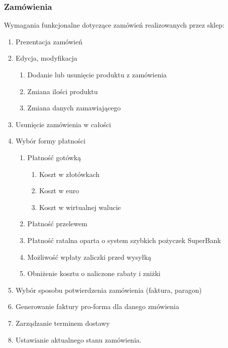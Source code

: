 \subsubsection{Zamówienia}

Wymagania funkcjonalne dotyczące zamówień realizowanych przez sklep:


\begin{enumerate}
  \item Prezentacja zamówień
  \item Edycja, modyfikacja
  \begin{enumerate}
    \item Dodanie lub usunięcie produktu z zamówienia
    \item Zmiana ilości produktu
    \item Zmiana danych zamawiającego
  \end{enumerate}
  \item Usunięcie zamówienia w całości
  \item Wybór formy płatności
  \begin{enumerate}
    \item Płatność gotówką
    \begin{enumerate}
      \item Koszt w złotówkach
      \item Koszt w euro
      \item Koszt w wirtualnej walucie
    \end{enumerate}
    \item Płatność przelewem
    \item Płatność ratalna oparta o system szybkich pożyczek SuperBank
    \item Możliwość wpłaty zaliczki przed wysyłką
    \item Obniżenie kosztu o naliczone rabaty i zniżki
  \end{enumerate}
  \item Wybór sposobu potwierdzenia zamówienia (faktura, paragon)
  \item Generowanie faktury pro-forma dla danego zmówienia
  \item Zarządzanie terminem dostawy
  \item Ustawianie aktualnego stanu zamówienia.
\end{enumerate}